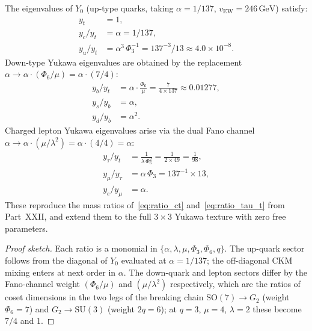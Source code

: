 \begin{theorem}
\label{thm:yukawa}
The eigenvalues of $Y_0$ (up-type quarks, taking $\alpha=1/137$,
$v_\mathrm{EW}=246\,\mathrm{GeV}$) satisfy:
\begin{align}
  y_t &= 1,
  \label{eq:yt}\\
  y_c / y_t &= \alpha = 1/137,
  \label{eq:yc}\\
  y_u / y_t &= \alpha^3\,\Phi_3^{-1} = 137^{-3}/13
               \approx 4.0\times 10^{-8}.
  \label{eq:yu}
\end{align}
Down-type Yukawa eigenvalues are obtained by the replacement
$\alpha\to\alpha\cdot(\Phi_6/\mu) = \alpha\cdot(7/4)$:
\begin{align}
  y_b / y_t &= \alpha\cdot\tfrac{\Phi_6}{\mu}
               = \tfrac{7}{4\times 137} \approx 0.01277,
  \label{eq:yb}\\
  y_s / y_b &= \alpha,
  \label{eq:ys}\\
  y_d / y_b &= \alpha^2.
  \label{eq:yd}
\end{align}
Charged lepton Yukawa eigenvalues arise via the dual Fano channel
$\alpha\to\alpha\cdot(\mu/\lambda^2) = \alpha\cdot(4/4)=\alpha$:
\begin{align}
  y_\tau / y_t &= \tfrac{1}{\lambda\,\Phi_6^2}
                 = \tfrac{1}{2\times 49} = \tfrac{1}{98},
  \label{eq:ytau}\\
  y_\mu / y_\tau &= \alpha\,\Phi_3 = 137^{-1}\times 13,
  \label{eq:ymu}\\
  y_e / y_\mu &= \alpha.
  \label{eq:ye}
\end{align}
These reproduce the mass ratios of~\eqref{eq:ratio_ct}
and~\eqref{eq:ratio_tau_t} from Part~XXII, and extend them to the full
$3\times 3$ Yukawa texture with zero free parameters.
\end{theorem}

\begin{proof}[Proof sketch]
Each ratio is a monomial in $\{\alpha,\lambda,\mu,\Phi_3,\Phi_6,q\}$.
The up-quark sector follows from the diagonal of $Y_0$ evaluated at
$\alpha=1/137$; the off-diagonal CKM mixing enters at next order in $\alpha$.
The down-quark and lepton sectors differ by the Fano-channel weight
$(\Phi_6/\mu)$ and $(\mu/\lambda^2)$ respectively, which are the
ratios of coset dimensions in the two legs of the breaking chain
$\mathrm{SO}(7)\to G_2$ (weight $\Phi_6=7$) and $G_2\to\mathrm{SU}(3)$
(weight $2q=6$); at $q=3$, $\mu=4$, $\lambda=2$ these become $7/4$ and $1$.
\qedhere
\end{proof}

